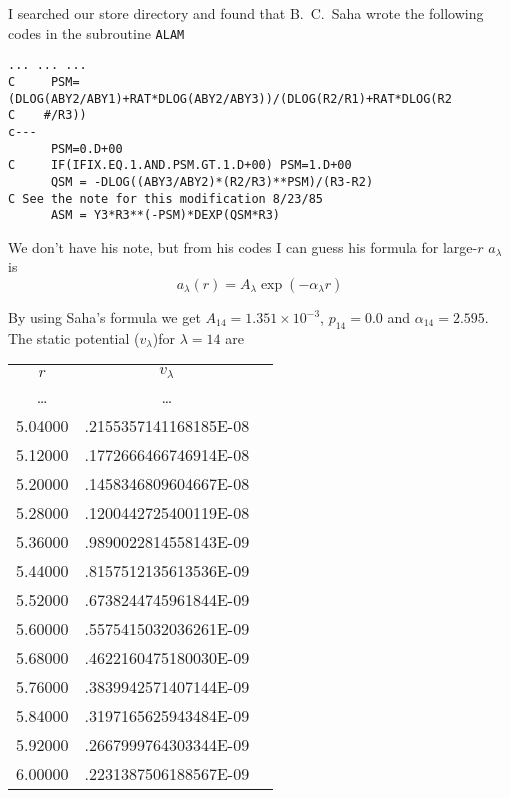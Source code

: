 \documentclass[aps,pra,groupedaddress,
                amsfonts,amssymb,
                preprint
    ]{revtex4}
\newcommand{\code}[1]{\texttt{#1}}
\begin{document}
I searched our store directory and found that B.~C.~Saha wrote the
following codes in the subroutine \code{ALAM}
\begin{center}
\begin{verbatim}
... ... ...
C     PSM=(DLOG(ABY2/ABY1)+RAT*DLOG(ABY2/ABY3))/(DLOG(R2/R1)+RAT*DLOG(R2
C    #/R3))
c---
      PSM=0.D+00
C     IF(IFIX.EQ.1.AND.PSM.GT.1.D+00) PSM=1.D+00
      QSM = -DLOG((ABY3/ABY2)*(R2/R3)**PSM)/(R3-R2)
C See the note for this modification 8/23/85
      ASM = Y3*R3**(-PSM)*DEXP(QSM*R3)
\end{verbatim}
\end{center}
We don't have his note, but from his codes I can guess his formula for
large-$r$ $a_\lambda$ is
\begin{equation}
  \label{eq:sahalal}
  a_\lambda(r) = A_\lambda\exp(-\alpha_\lambda r)
\end{equation}

By using Saha's formula we get $A_{14} = 1.351\times 10^{-3}$, $p_{14} =
0.0$ and $\alpha_{14} = 2.595$. The static potential ($v_\lambda$)for
$\lambda = 14$ are
\begin{center}
\begin{tabular}{ccc}
     $r$   &    $v_\lambda$ \\
   \ldots  &  \ldots               \\
   5.04000 &  \quad  .2155357141168185E-08 \\
   5.12000 &  \quad  .1772666466746914E-08 \\
   5.20000 &  \quad  .1458346809604667E-08 \\
   5.28000 &  \quad  .1200442725400119E-08 \\
   5.36000 &  \quad  .9890022814558143E-09 \\
   5.44000 &  \quad  .8157512135613536E-09 \\
   5.52000 &  \quad  .6738244745961844E-09 \\
   5.60000 &  \quad  .5575415032036261E-09 \\
   5.68000 &  \quad  .4622160475180030E-09 \\
   5.76000 &  \quad  .3839942571407144E-09 \\
   5.84000 &  \quad  .3197165625943484E-09 \\
   5.92000 &  \quad  .2667999764303344E-09 \\
   6.00000 &  \quad  .2231387506188567E-09
\end{tabular}
\end{center}
\end{document}
